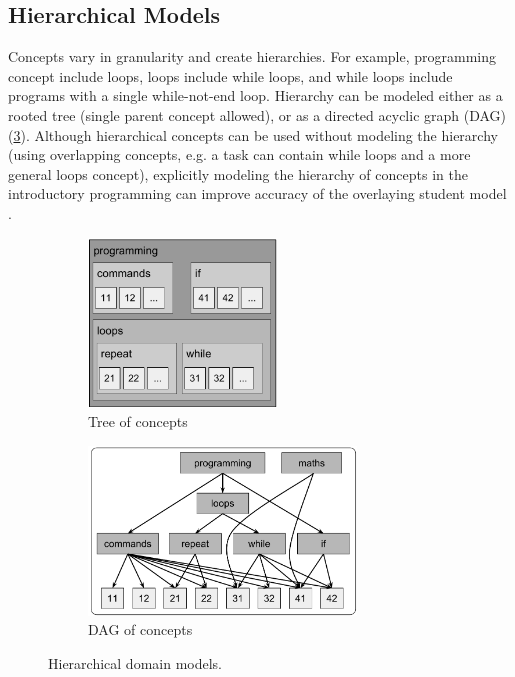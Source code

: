 \subsection{Hierarchical Models}

Concepts vary in granularity and create hierarchies.
For example, programming concept include loops, loops include while loops,
and while loops include programs with a single while-not-end loop.
Hierarchy can be modeled either as a rooted tree (single parent concept allowed),
or as a directed acyclic graph (DAG) (\cref{fig:concepts-hierarchical}).
Although hierarchical concepts can be used without modeling the hierarchy
(using overlapping concepts, e.g. a task can contain while loops and
a more general loops concept), explicitly modeling the hierarchy of concepts in
the introductory programming can improve accuracy of the overlaying student model
\cite{learner-models-integration-skills}.


\begin{figure}[htb]
\centering
\begin{subfigure}[t]{0.4\textwidth}
\centering
\includegraphics[height=45mm]{img/concepts-hierarchical-tree}
\caption{Tree of concepts}
\label{fig:concepts-hierarchical-tree}
\end{subfigure}%
\begin{subfigure}[t]{0.6\textwidth}
\centering
\includegraphics[height=45mm]{img/concepts-hierarchical-dag}
\caption{DAG of concepts}
\label{fig:concepts-hierarchical-dag}
\end{subfigure}
\caption{Hierarchical domain models.}
\label{fig:concepts-hierarchical}
\end{figure}

